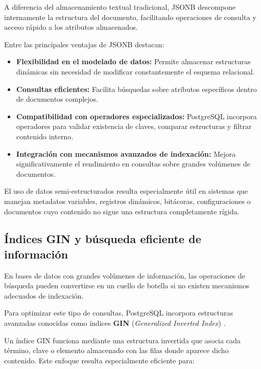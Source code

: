 A diferencia del almacenamiento textual tradicional, JSONB descompone internamente la estructura del documento, facilitando operaciones de consulta y acceso rápido a los atributos almacenados.

Entre las principales ventajas de JSONB destacan:

\begin{itemize}

\item \textbf{Flexibilidad en el modelado de datos:} Permite almacenar estructuras dinámicas sin necesidad de modificar constantemente el esquema relacional.

\item \textbf{Consultas eficientes:} Facilita búsquedas sobre atributos específicos dentro de documentos complejos.

\item \textbf{Compatibilidad con operadores especializados:} PostgreSQL incorpora operadores para validar existencia de claves, comparar estructuras y filtrar contenido interno.

\item \textbf{Integración con mecanismos avanzados de indexación:} Mejora significativamente el rendimiento en consultas sobre grandes volúmenes de documentos.
\end{itemize}

El uso de datos semi-estructurados resulta especialmente útil en sistemas que manejan metadatos variables, registros dinámicos, bitácoras, configuraciones o documentos cuyo contenido no sigue una estructura completamente rígida.

\subsection{Índices GIN y búsqueda eficiente de información}

En bases de datos con grandes volúmenes de información, las operaciones de búsqueda pueden convertirse en un cuello de botella si no existen mecanismos adecuados de indexación.

Para optimizar este tipo de consultas, PostgreSQL incorpora estructuras avanzadas conocidas como índices \textbf{GIN} (\textit{Generalized Inverted Index}) \cite{60}.

Un índice GIN funciona mediante una estructura invertida que asocia cada término, clave o elemento almacenado con las filas donde aparece dicho contenido. Este enfoque resulta especialmente eficiente para:

